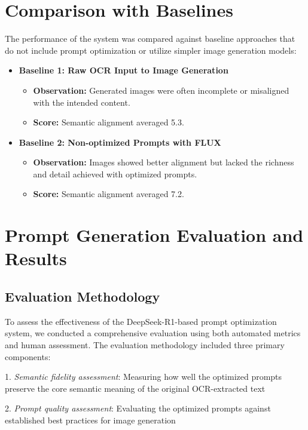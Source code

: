 \section{Comparison with Baselines}
The performance of the system was compared against baseline approaches that do not include prompt optimization or utilize simpler image generation models:
\begin{itemize}
    \item \textbf{Baseline 1: Raw OCR Input to Image Generation}
    \begin{itemize}
        \item \textbf{Observation:} Generated images were often incomplete or misaligned with the intended content.
        \item \textbf{Score:} Semantic alignment averaged 5.3.
    \end{itemize}
    \item \textbf{Baseline 2: Non-optimized Prompts with FLUX}
    \begin{itemize}
        \item \textbf{Observation:} Images showed better alignment but lacked the richness and detail achieved with optimized prompts.
        \item \textbf{Score:} Semantic alignment averaged 7.2.
    \end{itemize}
\end{itemize}


\section{Prompt Generation Evaluation and Results}

\subsection{Evaluation Methodology}

To assess the effectiveness of the DeepSeek-R1-based prompt optimization system, we conducted a comprehensive evaluation using both automated metrics and human assessment. The evaluation methodology included three primary components:

1. \textit{Semantic fidelity assessment}: Measuring how well the optimized prompts preserve the core semantic meaning of the original OCR-extracted text

2. \textit{Prompt quality assessment}: Evaluating the optimized prompts against established best practices for image generation

